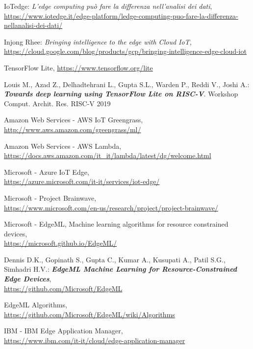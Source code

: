 \documentclass[a4paper,12pt,oneside]{book}
\begin{document}
\begin{thebibliography}{9}
	
	IoTedge: \textit{L’edge computing può fare la differenza nell’analisi dei dati},
	\url{https://www.iotedge.it/edge-platform/ledge-computing-puo-fare-la-differenza-nellanalisi-dei-dati/}
	
	Injong Rhee: \textit{Bringing intelligence to the edge with Cloud IoT},
	\\\url{https://cloud.google.com/blog/products/gcp/bringing-intelligence-edge-cloud-iot}
		
	TensorFlow Lite,
	\url{https://www.tensorflow.org/lite}
	
	Louis M., Azad Z., Delhadtehrani L., Gupta S.L., Warden P., Reddi V., Joshi A.: \textbf{\textit{Towards deep learning using TensorFlow Lite on RISC-V}}. Workshop Comput. Archit. Res. RISC-V 2019
	
	Amazon Web Services - AWS IoT Greengrass,
	\\\url{http://www.aws.amazon.com/greengrass/ml/}
	
	Amazon Web Services - AWS Lambda,
	\\\url{https://docs.aws.amazon.com/it_it/lambda/latest/dg/welcome.html}
	
	Microsoft - Azure IoT Edge,
	\\\url{https://azure.microsoft.com/it-it/services/iot-edge/}
	
	Microsoft - Project Brainwave,
	\\\url{https://www.microsoft.com/en-us/research/project/project-brainwave/}
	
	Microsoft - EdgeML, Machine learning algorithms for resource constrained devices,
	\\\url{https://microsoft.github.io/EdgeML/}
	
	Dennis D.K., Gopinath S., Gupta C., Kumar A., Kusupati A., Patil S.G., Simhadri H.V.: \textbf{\textit{EdgeML Machine Learning for Resource-Constrained Edge Devices}},
	\\\url{https://github.com/Microsoft/EdgeML}
	
	EdgeML Algorithms,
	\\\url{https://github.com/Microsoft/EdgeML/wiki/Algorithms}
	
	IBM - IBM Edge Application Manager,
	\\\url{https://www.ibm.com/it-it/cloud/edge-application-manager}
	

\end{thebibliography}
\end{document}

